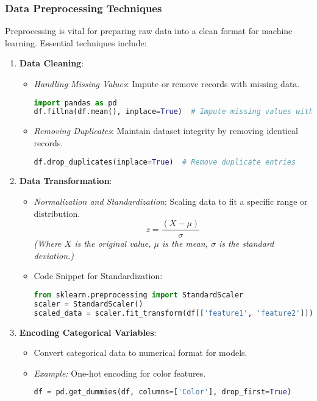 \documentclass[aspectratio=169]{beamer}
\begin{document}
\begin{frame}[fragile]
    \frametitle{Data Preprocessing Techniques}
    Preprocessing is vital for preparing raw data into a clean format for machine learning. Essential techniques include:

    \begin{enumerate}
        \item \textbf{Data Cleaning}:
        \begin{itemize}
            \item \textit{Handling Missing Values}: Impute or remove records with missing data.
            \begin{lstlisting}[language=Python]
import pandas as pd
df.fillna(df.mean(), inplace=True)  # Impute missing values with mean
            \end{lstlisting}
            \item \textit{Removing Duplicates}: Maintain dataset integrity by removing identical records.
            \begin{lstlisting}[language=Python]
df.drop_duplicates(inplace=True)  # Remove duplicate entries
            \end{lstlisting}
        \end{itemize}

        \item \textbf{Data Transformation}:
        \begin{itemize}
            \item \textit{Normalization and Standardization}: Scaling data to fit a specific range or distribution.
            \begin{equation}
                z = \frac{(X - \mu)}{\sigma}
            \end{equation}
            \textit{(Where \(X\) is the original value, \(\mu\) is the mean, \(\sigma\) is the standard deviation.)}
            \item Code Snippet for Standardization:
            \begin{lstlisting}[language=Python]
from sklearn.preprocessing import StandardScaler
scaler = StandardScaler()
scaled_data = scaler.fit_transform(df[['feature1', 'feature2']])
            \end{lstlisting}
        \end{itemize}
        
        \item \textbf{Encoding Categorical Variables}:
        \begin{itemize}
            \item Convert categorical data to numerical format for models.
            \item \textit{Example:} One-hot encoding for color features.
            \begin{lstlisting}[language=Python]
df = pd.get_dummies(df, columns=['Color'], drop_first=True)
            \end{lstlisting}
        \end{itemize}
    \end{enumerate}
\end{frame}
\end{document}
